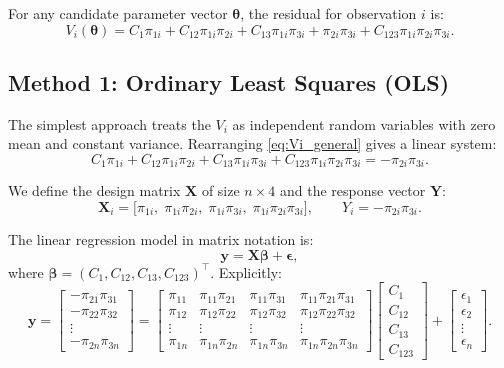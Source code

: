 For any candidate parameter vector \(\boldsymbol{\theta}\), the residual for observation \(i\) is:
\begin{equation}\label{eq:Vi_general}
V_i(\boldsymbol{\theta}) = C_1\pi_{1i} + C_{12}\pi_{1i}\pi_{2i} + C_{13}\pi_{1i}\pi_{3i} + \pi_{2i}\pi_{3i} + C_{123}\pi_{1i}\pi_{2i}\pi_{3i}.
\end{equation}

\subsection{Method 1: Ordinary Least Squares (OLS)}
\label{sec:method-ols}

The simplest approach treats the \(V_i\) as independent random variables with zero mean and constant variance. Rearranging \eqref{eq:Vi_general} gives a linear system:
\begin{equation}\label{eq:linear_system}
C_1\pi_{1i} + C_{12}\pi_{1i}\pi_{2i} + C_{13}\pi_{1i}\pi_{3i} + C_{123}\pi_{1i}\pi_{2i}\pi_{3i} = -\pi_{2i}\pi_{3i}.
\end{equation}

We define the design matrix \(\mathbf{X}\) of size \(n \times 4\) and the response vector \(\mathbf{Y}\):
\[
\mathbf{X}_i = \bigl[\pi_{1i},\; \pi_{1i}\pi_{2i},\; \pi_{1i}\pi_{3i},\; \pi_{1i}\pi_{2i}\pi_{3i}\bigr],\qquad
Y_i = -\pi_{2i}\pi_{3i}.
\]

The linear regression model in matrix notation is:
\begin{equation}
\mathbf{y} = \mathbf{X}\boldsymbol{\beta} + \boldsymbol{\epsilon},
\label{eq:matrixregression}
\end{equation}
where \(\boldsymbol{\beta} = (C_1, C_{12}, C_{13}, C_{123})^\top\). Explicitly:
\[
\mathbf{y} = \begin{bmatrix}
-\pi_{21}\pi_{31} \\
-\pi_{22}\pi_{32} \\
\vdots \\
-\pi_{2n}\pi_{3n}
\end{bmatrix} =
\begin{bmatrix}
\pi_{11} & \pi_{11}\pi_{21} & \pi_{11}\pi_{31} & \pi_{11}\pi_{21}\pi_{31} \\
\pi_{12} & \pi_{12}\pi_{22} & \pi_{12}\pi_{32} & \pi_{12}\pi_{22}\pi_{32} \\
\vdots & \vdots & \vdots & \vdots \\
\pi_{1n} & \pi_{1n}\pi_{2n} & \pi_{1n}\pi_{3n} & \pi_{1n}\pi_{2n}\pi_{3n}
\end{bmatrix}
\begin{bmatrix}
C_1 \\ C_{12} \\ C_{13} \\ C_{123}
\end{bmatrix}
+
\begin{bmatrix}
\epsilon_1 \\ \epsilon_2 \\ \vdots \\ \epsilon_n
\end{bmatrix}.
\]

